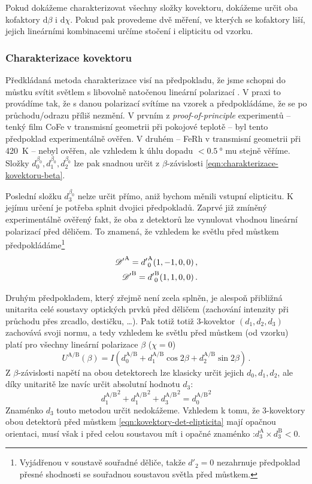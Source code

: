 Pokud dokážeme charakterizovat všechny složky kovektoru, dokážeme určit oba kofaktory $\textrm{d}\beta$ i $\textrm{d}\chi$.
Pokud pak provedeme dvě měření, ve kterých se kofaktory liší, jejich lineárními kombinacemi určíme stočení i elipticitu od vzorku.

\subsubsection*{Charakterizace kovektoru}

Předkládaná metoda charakterizace visí na předpokladu, že jsme schopni do můstku svítit světlem s libovolně natočenou lineární polarizací \beta.
V praxi to provádíme tak, že s danou polarizací svítíme na vzorek a předpokládáme, že se po průchodu/odrazu příliš nezmění.
V prvním z \emph{proof-of-principle} experimentů -- tenký film CoFe v transmisní geometrii při pokojové teplotě -- byl tento předpoklad experimentálně ověřen.
V druhém -- FeRh v transmisní geometrii při \SI{420}{\kelvin} -- nebyl ověřen, ale vzhledem k úhlu dopadu $<\SI{0.5}{\degree}$ mu stejně věříme.
Složky $d^{\beta_0}_0, d^{\beta_0}_1, d^{\beta_0}_2$ lze pak snadnou určit z $\beta$-závislosti \eqref{eqn:charakterizace-kovektoru-beta}.


Poslední složku $d^{\beta_0}_3$ nelze určit přímo, aniž bychom měnili vstupní elipticitu.
K jejímu určení je potřeba splnit dvojici předpokladů.
Zaprvé již zmíněný experimentálně ověřený fakt, že oba z detektorů lze vynulovat vhodnou lineární polarizací před děličem.
To znamená, že vzhledem ke světlu před můstkem předpokládáme\footnote{Vyjádřenou v soustavě souřadné děliče, takže $d'_2=0$ nezahrnuje předpoklad přesné shodnosti se souřadnou soustavou světla před můstkem.}
\begin{align}
\label{eqn:kovektory-det-elipticita}
{\mathscr{D}'}^\textrm{A} = {d'}^{\textrm{A}}_0(1, -1, 0, 0) \,,\\
{\mathscr{D}'}^\textrm{B} = {d'}^\textrm{B}_0(1, 1, 0, 0) \,.
\end{align}

Druhým předpokladem, který zřejmě není zcela splněn, je alespoň přibližná unitarita celé soustavy optických prvků před děličem (zachování intenzity při průchodu přes zrcadlo, destičku, \ldots).
Pak totiž totiž 3-kovektor $(d_1, d_2, d_3)$ zachovává svoji normu, a tedy vzhledem ke světlu před můstkem (od vzorku) platí pro všechny lineární polarizace $\beta$ ($\chi=0$)
\begin{equation}
    U^\textrm{A/B}(\beta) = I \left( d^\textrm{A/B}_0 + d^\textrm{A/B}_1 \cos2\beta + d^\textrm{A/B}_2 \sin2\beta  \right) \,.
\end{equation}
Z $\beta$-závislosti napětí na obou detektorech lze klasicky určit jejich $d_0, d_1, d_2$, ale díky unitaritě lze navíc určit absolutní hodnotu $d_3$:
\begin{equation}
{d_1^\textrm{A/B}}^2 +  {d_1^\textrm{A/B}}^2 + {d_3^\textrm{A/B}}^2 = {d_0^\textrm{A/B}}^2
\end{equation}
Znaménko $d_3$ touto metodou určit nedokážeme.
Vzhledem k tomu, že 3-kovektory obou detektorů před můstkem \eqref{eqn:kovektory-det-elipticita} mají opačnou orientaci, musí však i před celou soustavou mít i opačné znaménko :$d^\textrm{A}_3 \times d^\textrm{B}_3 < 0$.

